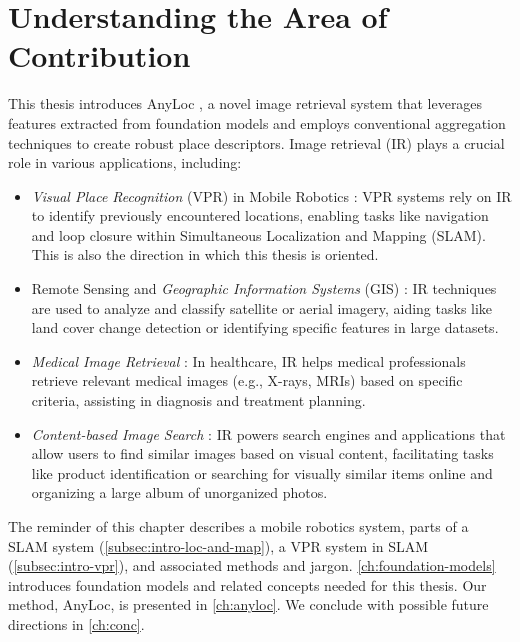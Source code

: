\section{Understanding the Area of Contribution}

This thesis introduces AnyLoc \cite{Keetha2023AnyLocTU}, a novel image
retrieval system that leverages features extracted from foundation
models and employs conventional aggregation techniques to create
robust place descriptors.  Image retrieval (IR) plays a crucial role
in various applications, including:

\begin{itemize}
    \item \emph{Visual Place Recognition} (VPR) in Mobile Robotics
        \cite{Humenberger2022InvestigatingTR}: VPR systems rely on IR
        to identify previously encountered locations, enabling tasks
        like navigation and loop closure within Simultaneous
        Localization and Mapping (SLAM). This is also the direction in
        which this thesis is oriented.
    \item Remote Sensing and \emph{Geographic Information Systems}
        (GIS) \cite{Maiwald2021FullyAP}: IR techniques are used to
        analyze and classify satellite or aerial imagery, aiding tasks
        like land cover change detection or identifying specific
        features in large datasets.
    \item \emph{Medical Image Retrieval} \cite{Qayyum2017MedicalIR, 
        Lehmann2004ContentbasedIR}: In healthcare, IR helps medical
        professionals retrieve relevant medical images (e.g., X-rays,
        MRIs) based on specific criteria, assisting in diagnosis and
        treatment planning.
    \item \emph{Content-based Image Search}
        \cite{Hermes2023ContentbasedIR}: IR powers search engines and
        applications that allow users to find similar images based on
        visual content, facilitating tasks like product identification
        or searching for visually similar items online and organizing
        a large album of unorganized photos.
\end{itemize}

The reminder of this chapter describes a mobile robotics system, parts
of a SLAM system (\cref{subsec:intro-loc-and-map}), a VPR system in
SLAM (\cref{subsec:intro-vpr}), and associated methods and jargon.
\cref{ch:foundation-models} introduces foundation models and related
concepts needed for this thesis. Our method, AnyLoc, is presented in
\cref{ch:anyloc}. We conclude with possible future directions in
\cref{ch:conc}.

